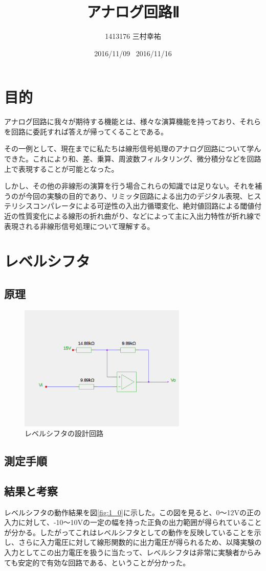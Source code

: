 \documentclass[11pt,a4j]{jsarticle}
\title{アナログ回路Ⅱ}
\author{1413176 三村幸祐}
\date{2016/11/09 \, 2016/11/16}
\begin{document}
  
  
 \section{目的}
 アナログ回路に我々が期待する機能とは、様々な演算機能を持っており、それらを回路に委託すれば答えが帰ってくることである。
 
  その一例として、現在までに私たちは線形信号処理のアナログ回路について学んできた。これにより和、差、乗算、周波数フィルタリング、微分積分などを回路上で表現することが可能となった。
  
  しかし、その他の非線形の演算を行う場合これらの知識では足りない。それを補うのが今回の実験の目的であり、リミッタ回路による出力のデジタル表現、ヒステリシスコンパレータによる可逆性の入出力循環変化、絶対値回路による閾値付近の性質変化による線形の折れ曲がり、などによって主に入出力特性が折れ線で表現される非線形信号処理について理解する。
  
  
 \section{レベルシフタ}
  \subsection{原理}
   
   \begin{figure}[htbp]
  \centering
  \includegraphics[width=8cm,clip]{levelshifter.png}
  \caption{レベルシフタの設計回路}
  \label{fig:levelshifter}
 \end{figure}%
   
  \subsection{測定手順}
   
   
  \subsection{結果と考察}
  レベルシフタの動作結果を図\ref{fig:1_0}に示した。この図を見ると、0～12Vの正の入力に対して、-10～10Vの一定の幅を持った正負の出力範囲が得られていることが分かる。したがってこれはレベルシフタとしての動作を反映していることを示し、さらに入力電圧に対して線形関数的に出力電圧が得られるため、以降実験の入力としてこの出力電圧を扱うに当たって、レベルシフタは非常に実験者からみても安定的で有効な回路である、ということが分かった。
  
\end{document}
